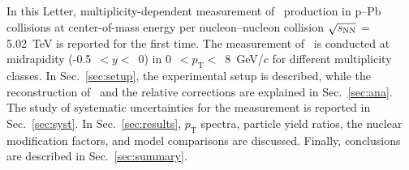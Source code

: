 In this Letter, multiplicity-dependent measurement of \fzero~production in p--Pb collisions at center-of-mass energy per nucleon--nucleon collision $\sqrt{s_{\rm NN}}$ = 5.02~TeV is reported for the first time. The measurement of \fzero~is conducted at midrapidity (-0.5~$<y<$~0) in 0~$<p_{\mathrm{T}}<$~8~GeV/$c$ for different multiplicity classes. In Sec.~\ref{sec:setup}, the experimental setup is described, while the reconstruction of \fzero\ and the relative corrections are explained in Sec.~\ref{sec:ana}. The study of systematic uncertainties for the measurement is reported in Sec.~\ref{sec:syst}. In Sec.~\ref{sec:results}, $p_{\mathrm{T}}$ spectra, particle yield ratios, the nuclear modification factors, and model comparisons are discussed. Finally, conclusions are described in Sec.~\ref{sec:summary}.


\label{sec:intro}



